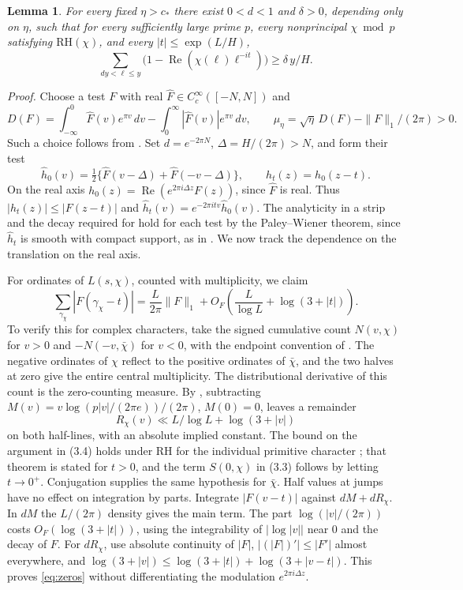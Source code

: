 \documentclass[11pt]{article}
\newtheorem{lemma}{Lemma}
\newcommand{\cstar}{c_*}
\newcommand{\re}{\operatorname{Re}}
\begin{document}
\begin{lemma}\label{lem:distance}
For every fixed \(\eta>\cstar\) there exist \(0<d<1\) and \(\delta>0\),
depending only on \(\eta\), such that for every sufficiently large
prime \(p\), every nonprincipal \(\chi\bmod p\) satisfying
\(\mathrm{RH}(\chi)\), and every
\(|t|\le\exp(L/H)\),
\begin{equation}\label{eq:distance}
 \sum_{dy<\ell\le y}\bigl(1-\re(\chi(\ell)\ell^{-it})\bigr)
 \ge \delta\,y/H .
\end{equation}
\end{lemma}
\emph{Proof.}
Choose a test \(F\) with real \(\widehat F\in C_c^\infty([-N,N])\) and
\[
 D(F)=\int_{-\infty}^0\widehat F(v)e^{\pi v}\,dv
      -\int_0^\infty |\widehat F(v)|e^{\pi v}\,dv,\qquad
 \mu_\eta=\sqrt\eta\,D(F)-\|F\|_1/(2\pi)>0.
\]
Such a choice follows from \cite[Theorem 4(i), (4.13) and \S4.4]{cmqr}.
Set \(d=e^{-2\pi N}\), \(\Delta=H/(2\pi)>N\), and form their test
\[
 \widehat h_0(v)=\tfrac12\{\widehat F(v-\Delta)+\widehat F(-v-\Delta)\},
 \qquad h_t(z)=h_0(z-t).
\]
On the real axis \(h_0(z)=\re(e^{2\pi i\Delta z}F(z))\), since
\(\widehat F\) is real. Thus \(|h_t(z)|\le |F(z-t)|\) and
\(\widehat h_t(v)=e^{-2\pi itv}\widehat h_0(v)\).
The analyticity in a strip and the decay required for \cite[(3.1)]{cmqr}
hold for each test by the Paley--Wiener theorem, since \(\widehat h_t\)
is smooth with compact support, as in \cite[\S4.1]{cmqr}. We now track the dependence
on the translation on the real axis.

For ordinates of \(L(s,\chi)\), counted with multiplicity, we claim
\begin{equation}\label{eq:zeros}
 \sum_{\gamma_\chi}|F(\gamma_\chi-t)|
 =\frac{L}{2\pi}\|F\|_1+
 O_F\!\left(\frac{L}{\log L}+\log(3+|t|)\right).
\end{equation}
To verify this for complex characters, take the signed cumulative count
\(N(v,\chi)\) for \(v>0\) and \(-N(-v,\bar\chi)\) for \(v<0\),
with the endpoint convention of \cite[(3.3)]{cmqr}. The negative
ordinates of \(\chi\) reflect to the positive ordinates of \(\bar\chi\), and
the two halves at zero give the entire central multiplicity. The
distributional derivative of this count is the zero-counting measure.
By \cite[(3.3)--(3.4)]{cmqr}, subtracting
\(M(v)=v\log(p|v|/(2\pi e))/(2\pi)\), \(M(0)=0\), leaves a remainder
\[
 R_\chi(v)\ll L/\log L+\log(3+|v|)
\]
on both half-lines, with an absolute implied constant. The bound on the
argument in (3.4) holds under RH for the individual primitive character
\cite[Theorem 5 and Example 8]{ccm}; that theorem is stated for \(t>0\),
and the term \(S(0,\chi)\) in (3.3) follows by letting \(t\to0^+\). Conjugation supplies the same
hypothesis for \(\bar\chi\). Half values at
jumps have no effect on integration by parts. Integrate
\(|F(v-t)|\) against \(dM+dR_\chi\).
In \(dM\) the \(L/(2\pi)\) density gives the main term.
The part \(\log(|v|/(2\pi))\) costs \(O_F(\log(3+|t|))\), using the
integrability of \(|\log|v||\) near \(0\) and the decay of \(F\).
For \(dR_\chi\), use absolute continuity of \(|F|\),
\(|(|F|)'|\le |F'|\) almost everywhere, and
\(\log(3+|v|)\le\log(3+|t|)+\log(3+|v-t|)\).
This proves \eqref{eq:zeros} without differentiating the modulation
\(e^{2\pi i\Delta z}\).
\end{document}
